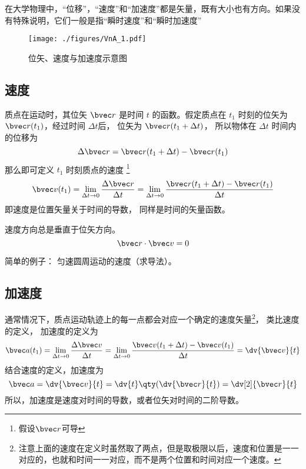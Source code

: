 

在大学物理中，“位移”，“速度”和“加速度”都是矢量，既有大小也有方向。如果没有特殊说明，它们一般是指“瞬时速度”和“瞬时加速度”

\begin{figure}[ht]
\centering
\texttt{[image: ./figures/VnA\_1.pdf]}
\caption{位矢、速度与加速度示意图} \label{VnA_fig1}
\end{figure}

\subsection{速度}

质点在运动时，其位矢 $\bvec r$ 是时间 $t$ 的函数。假定质点在 $t_1$ 时刻的位矢为 $\bvec r(t_1)$，经过时间 $\Delta t$后， 位矢为 $\bvec r(t_1 + \Delta t)$， 所以物体在 $\Delta t$ 时间内的位移为
\begin{equation}
\Delta \bvec r = \bvec r (t_1 + \Delta t) - \bvec r (t_1)
\end{equation}
那么即可定义 $t_1$ 时刻质点的速度
\footnote{假设$\bvec r$可导}
\begin{equation}
\bvec v(t_1) = \lim_{\Delta t \to 0} \frac{\Delta \bvec r}{\Delta t} = \lim_{\Delta t \to 0} \frac{\bvec r (t_1 + \Delta t) - \bvec r(t_1)}{\Delta t}
\end{equation}
即速度是位置矢量关于时间的导数， 同样是时间的矢量函数。

\begin{theorem}{}
速度方向总是垂直于位矢方向。
\begin{equation}
\bvec r \cdot \bvec v = 0
\end{equation}
\end{theorem}

简单的例子： 匀速圆周运动的速度（求导法）。

\subsection{加速度}

通常情况下，质点运动轨迹上的每一点都会对应一个确定的速度矢量\footnote{注意上面的速度在定义时虽然取了两点，但是取极限以后，速度和位置是一一对应的，也就和时间一一对应，而不是两个位置和时间对应一个速度。}， 类比速度的定义， 加速度的定义为
\begin{equation}\label{VnA_eq4}
\bvec a(t_1) = \lim_{\Delta t \to 0} \frac{\Delta \bvec v}{\Delta t}
= \lim_{\Delta t \to 0} \frac{\bvec v(t_1 + \Delta t) - \bvec v (t_1)}{\Delta t} = \dv{\bvec v}{t}
\end{equation}
结合速度的定义，加速度为
\begin{equation}
\bvec a = \dv{\bvec v}{t} = \dv{t} \qty( \dv{\bvec r}{t} ) = \dv[2]{\bvec r}{t}
\end{equation}
所以，加速度是速度对时间的导数，或者位矢对时间的二阶导数。

